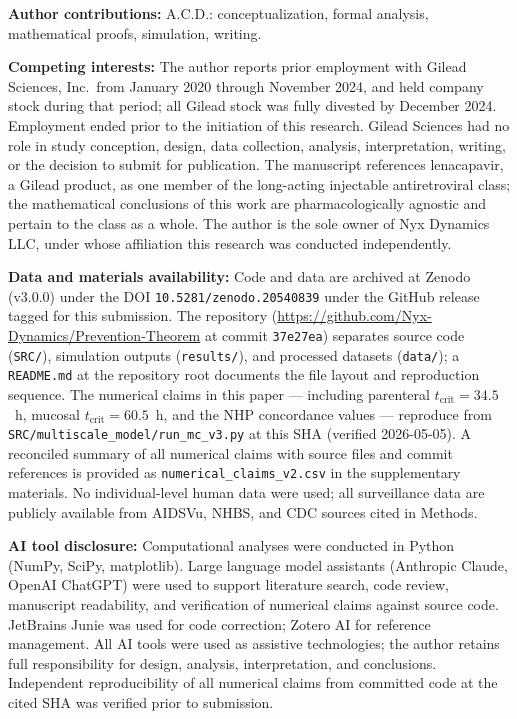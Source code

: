 \documentclass[10pt,letterpaper]{article}
\theoremstyle{definition}
\theoremstyle{remark}
\newcommand{\tcrit}{t_{\text{crit}}}
\begin{document}
\textbf{Author contributions:} A.C.D.: conceptualization, formal analysis, mathematical proofs, simulation, writing.

\textbf{Competing interests:} The author reports prior employment with Gilead Sciences, Inc.\ from January 2020 through November 2024, and held company stock during that period; all Gilead stock was fully divested by December 2024. Employment ended prior to the initiation of this research. Gilead Sciences had no role in study conception, design, data collection, analysis, interpretation, writing, or the decision to submit for publication. The manuscript references lenacapavir, a Gilead product, as one member of the long-acting injectable antiretroviral class; the mathematical conclusions of this work are pharmacologically agnostic and pertain to the class as a whole. The author is the sole owner of Nyx Dynamics LLC, under whose affiliation this research was conducted independently.

\textbf{Data and materials availability:} Code and data are archived at Zenodo (v3.0.0) under the DOI \texttt{10.5281/zenodo.20540839} under the GitHub release tagged for this submission. The repository (\url{https://github.com/Nyx-Dynamics/Prevention-Theorem} at commit \texttt{37e27ea}) separates source code (\texttt{SRC/}), simulation outputs (\texttt{results/}), and processed datasets (\texttt{data/}); a \texttt{README.md} at the repository root documents the file layout and reproduction sequence. The numerical claims in this paper --- including parenteral $\tcrit = 34.5$~h, mucosal $\tcrit = 60.5$~h, and the NHP concordance values --- reproduce from \texttt{SRC/multiscale\_model/run\_mc\_v3.py} at this SHA (verified 2026-05-05). A reconciled summary of all numerical claims with source files and commit references is provided as \texttt{numerical\_claims\_v2.csv} in the supplementary materials. No individual-level human data were used; all surveillance data are publicly available from AIDSVu, NHBS, and CDC sources cited in Methods.

\textbf{AI tool disclosure:} Computational analyses were conducted in Python (NumPy, SciPy, matplotlib). Large language model assistants (Anthropic Claude, OpenAI ChatGPT) were used to support literature search, code review, manuscript readability, and verification of numerical claims against source code. JetBrains Junie was used for code correction; Zotero AI for reference management. All AI tools were used as assistive technologies; the author retains full responsibility for design, analysis, interpretation, and conclusions. Independent reproducibility of all numerical claims from committed code at the cited SHA was verified prior to submission.
\end{document}
